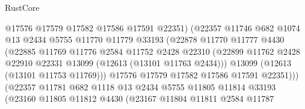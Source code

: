 \begin{lexlean}{RustCore}
\begin{coremodule}
                                  @17576
                                  @17579
                                  @17582
                                  @17586
                                  @17591
                                  @22351)
                                (@22357
                                  @11746
                                  @682
                                  @1074
                                  @13
                                  @2434
                                  @5755
                                  @11770
                                  @11779
                                  @33193
                                  (@22878
                                    @11770
                                    @11777
                                    @4430
                                    (@22885
                                      @11769
                                      @11776
                                      @2584
                                      @11752
                                      @2428
                                      @22310
                                      (@22899
                                        @11762
                                        @2428
                                        @22910
                                        @22331
                                        @13099
                                        (@12613 (@13101 @11763 @2434)))
                                      @13099
                                      (@12613 (@13101 @11753 @11769)))
                                    @17576
                                    @17579
                                    @17582
                                    @17586
                                    @17591
                                    @22351)))
                              (@22357
                                @11781
                                @682
                                @1118
                                @13
                                @2434
                                @5755
                                @11805
                                @11814
                                @33193
                                (@23160
                                  @11805
                                  @11812
                                  @4430
                                  (@23167
                                    @11804
                                    @11811
                                    @2584
                                    @11787

\end{coremodule}
\end{lexlean}
